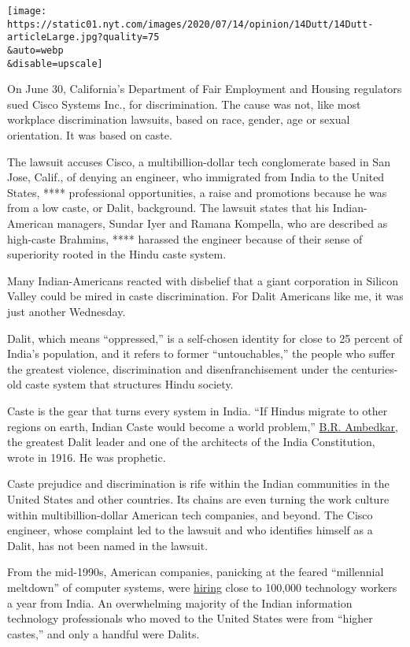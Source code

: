\texttt{[image: https://static01.nyt.com/images/2020/07/14/opinion/14Dutt/14Dutt-articleLarge.jpg?quality=75\\\&auto=webp\\\&disable=upscale]}

On June 30, California's Department of Fair Employment and Housing
regulators sued Cisco Systems Inc., for discrimination. The cause was
not, like most workplace discrimination lawsuits, based on race, gender,
age or sexual orientation. It was based on caste.

The lawsuit accuses Cisco, a multibillion-dollar tech conglomerate based
in San Jose, Calif., of denying an engineer, who immigrated from India
to the United States, **** professional opportunities, a raise and
promotions because he was from a low caste, or Dalit, background. The
lawsuit states that his Indian-American managers, Sundar Iyer and Ramana
Kompella, who are described as high-caste Brahmins, **** harassed the
engineer because of their sense of superiority rooted in the Hindu caste
system.

Many Indian-Americans reacted with disbelief that a giant corporation in
Silicon Valley could be mired in caste discrimination. For Dalit
Americans like me, it was just another Wednesday.

Dalit, which means ``oppressed,'' is a self-chosen identity for close to
25 percent of India's population, and it refers to former
``untouchables,'' the people who suffer the greatest violence,
discrimination and disenfranchisement under the centuries-old caste
system that structures Hindu society.

Caste is the gear that turns every system in India. ``If Hindus migrate
to other regions on earth, Indian Caste would become a world problem,''
\href{http://www.columbia.edu/itc/mealac/pritchett/00ambedkar/txt_ambedkar_castes.html}{B.R.
Ambedkar}, the greatest Dalit leader and one of the architects of the
India Constitution, wrote in 1916. He was prophetic.

Caste prejudice and discrimination is rife within the Indian communities
in the United States and other countries. Its chains are even turning
the work culture within multibillion-dollar American tech companies, and
beyond. The Cisco engineer, whose complaint led to the lawsuit and who
identifies himself as a Dalit, has not been named in the lawsuit.

From the mid-1990s, American companies, panicking at the feared
``millennial meltdown'' of computer systems, were
\href{https://www8.gsb.columbia.edu/articles/chazen-global-insights/singular-population-indian-immigrants-america}{hiring}
close to 100,000 technology workers a year from India. An overwhelming
majority of the Indian information technology professionals who moved to
the United States were from ``higher castes,'' and only a handful were
Dalits.

